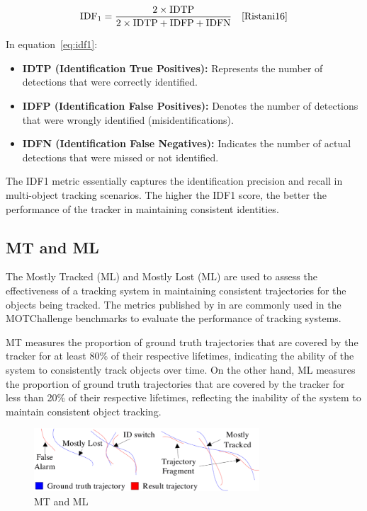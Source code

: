 \begin{equation}
    \label{eq:idf1}
    \text{IDF}_1 = \frac{2 \times \text{IDTP}}{2 \times \text{IDTP} + \text{IDFP} + \text{IDFN}}
    \quad\text{\cite[Eq.~11]{Ristani16}}
\end{equation}

In equation~\ref{eq:idf1}:

\begin{itemize}
    \item \textbf{IDTP (Identification True Positives):} Represents the number of detections that were correctly identified.
    \item \textbf{IDFP (Identification False Positives):} Denotes the number of detections that were wrongly identified (misidentifications).
    \item \textbf{IDFN (Identification False Negatives):} Indicates the number of actual detections that were missed or not identified.
\end{itemize}

The IDF1 metric essentially captures the identification precision and recall in multi-object tracking scenarios. The higher the IDF1 score, the better the performance of the tracker in maintaining consistent identities.

\subsection{MT and ML}\label{subsec:mt_ml}
The Mostly Tracked (ML) and Mostly Lost (ML) are used to assess the effectiveness of a tracking system in maintaining consistent trajectories for the objects being tracked. The metrics published by \textcite{Wu06} in \citeyear{Wu06} are commonly used in the MOTChallenge benchmarks to evaluate the performance of tracking systems.

MT measures the proportion of ground truth trajectories that are covered by the tracker for at least 80\% of their respective lifetimes, indicating the ability of the system to consistently track objects over time. On the other hand, ML measures the proportion of ground truth trajectories that are covered by the tracker for less than 20\% of their respective lifetimes, reflecting the inability of the system to maintain consistent object tracking.

\begin{figure}[ht]
    \centering
    \includegraphics[width=0.75\textwidth]{resources/fig/Wu06-MT_ML.png}
    \caption{MT and ML~\cite[Fig.~5]{Wu06}}\label{fig:mt_ml}
\end{figure}

